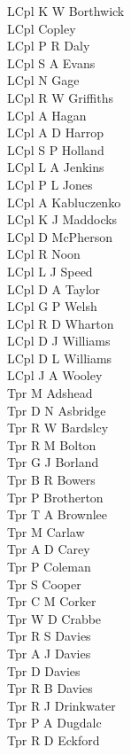\begin{multicols}{4}
  LCpl K W Borthwick \\
  LCpl Copley \\
  LCpl P R Daly \\
  LCpl S A Evans \\
  LCpl N Gage \\
  LCpl R W Griffiths \\
  LCpl A Hagan \\
  LCpl A D Harrop \\
  LCpl S P Holland \\
  LCpl L A Jenkins \\
  LCpl P L Jones \\
  LCpl A Kabluczenko \\
  LCpl K J Maddocks \\
  LCpl D McPherson \\
  LCpl R Noon \\
  LCpl L J Speed \\
  LCpl D A Taylor \\
  LCpl G P Welsh \\
  LCpl R D Wharton \\
  LCpl D J Williams \\
  LCpl D L Williams \\
  LCpl J A Wooley \\
  Tpr M Adshead \\
  Tpr D N Asbridge \\
  Tpr R W Bardslcy \\
  Tpr R M Bolton \\
  Tpr G J Borland \\
  Tpr B R Bowers  \\
  Tpr P Brotherton \\
  Tpr T A Brownlee \\
  Tpr M Carlaw \\
  Tpr A D Carey \\
  Tpr P Coleman \\
  Tpr S Cooper \\
  Tpr C M Corker \\
  Tpr W D Crabbe \\
  Tpr R S Davies \\
  Tpr A J Davies \\
  Tpr D Davies \\
  Tpr R B Davies \\
  Tpr R J Drinkwater \\
  Tpr P A Dugdalc \\
  Tpr R D Eckford \\

\end{multicols}
